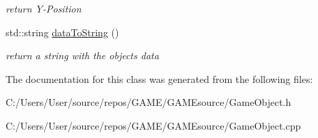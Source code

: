 \begin{DoxyCompactItemize}
\begin{DoxyCompactList}\small\item\em return Y-\/\+Position \end{DoxyCompactList}\item 
\mbox{\label{class_game_object_af9bc07709ad106c507cccdef63d86254}} 
std\+::string \mbox{\hyperlink{class_game_object_af9bc07709ad106c507cccdef63d86254}{data\+To\+String}} ()
\begin{DoxyCompactList}\small\item\em return a string with the object\textquotesingle{}s data \end{DoxyCompactList}\end{DoxyCompactItemize}


The documentation for this class was generated from the following files\+:\begin{DoxyCompactItemize}
\item 
C\+:/\+Users/\+User/source/repos/\+G\+A\+M\+E/\+G\+A\+M\+Esource/Game\+Object.\+h\item 
C\+:/\+Users/\+User/source/repos/\+G\+A\+M\+E/\+G\+A\+M\+Esource/Game\+Object.\+cpp\end{DoxyCompactItemize}
